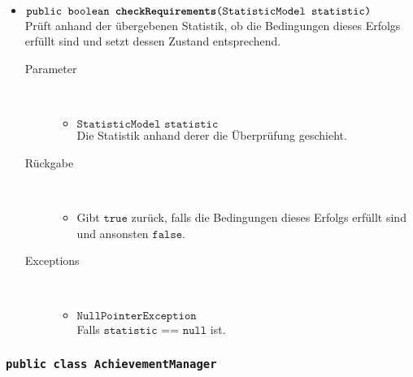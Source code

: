 \begin{description}
\begin{itemize}
		\item $\texttt{public boolean \textbf{checkRequirements}(StatisticModel statistic)}$ \\ Prüft anhand der übergebenen Statistik, ob die Bedingungen dieses Erfolgs erfüllt sind und setzt dessen Zustand entsprechend.
		\begin{description}
		\item[Parameter] \hfill \\
			\vspace{-.8cm}
			\begin{itemize}
				\item $\texttt{StatisticModel statistic}$ \\ Die Statistik anhand derer die Überprüfung geschieht. 
			\end{itemize}
			\item[Rückgabe] \hfill \\
			\vspace{-.8cm}
			\begin{itemize}
				\item Gibt $\texttt{true}$ zurück, falls die Bedingungen dieses Erfolgs erfüllt sind und ansonsten $\texttt{false}$.
			\end{itemize}
			\item[Exceptions] \hfill \\
			\vspace{-.8cm}
			\begin{itemize}
				\item $\texttt{NullPointerException}$ \\ Falls $\texttt{statistic == null}$ ist.
			\end{itemize}
		\end{description}
	\end{itemize}
\end{description}

\subsubsection{\normalfont \texttt{public class \textbf{AchievementManager}}}

